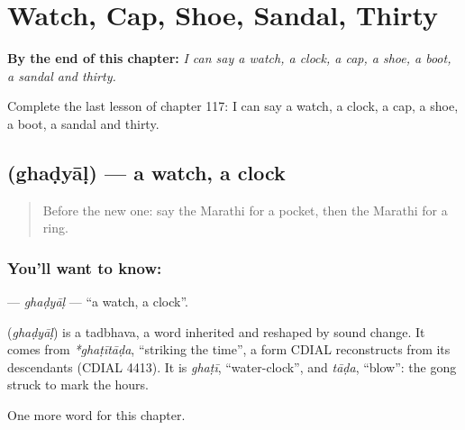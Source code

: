 
\chapter{Watch, Cap, Shoe, Sandal, Thirty}
\label{ch:mr-watch-cap-shoe-sandal-thirty}

\begin{chapteropening}
\textbf{By the end of this chapter:} \emph{I can say a watch, a clock, a cap, a shoe, a boot, a sandal and thirty.}

Complete the last lesson of chapter 117: I can say a watch, a clock, a cap, a shoe, a boot, a sandal and thirty.
\end{chapteropening}

\section[\texorpdfstring{\mr{घड्याळ} (ghaḍyāḷ)}{घड्याळ (ghaḍyāḷ)}]{ (ghaḍyāḷ) — a watch, a clock}

\label{lesson:MR-C117-ghadyal}



\begin{quote}
Before the new one: say the Marathi for a pocket, then the Marathi for a ring.
\end{quote}

\subsection*{You'll want to know: }
\textbf{} — \emph{ghaḍyāḷ} — \textquotedblleft{}a watch, a clock\textquotedblright{}.

\begin{cousinweb}
\textbf{} (\emph{ghaḍyāḷ}) is a tadbhava, a word inherited and reshaped by sound change. It comes from \emph{*ghaṭītāḍa}, \textquotedblleft{}striking the time\textquotedblright{}, a form CDIAL reconstructs from its descendants (CDIAL 4413). It is \emph{ghaṭī}, \textquotedblleft{}water-clock\textquotedblright{}, and \emph{tāḍa}, \textquotedblleft{}blow\textquotedblright{}: the gong struck to mark the hours.
\end{cousinweb}

\begin{grammarlens}[title={What you've built}]
One more word for this chapter.
\end{grammarlens}

